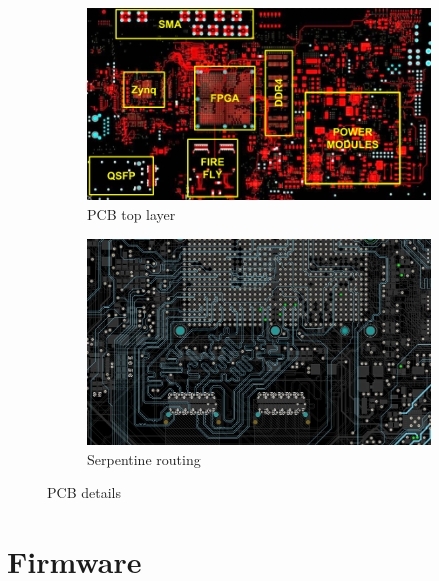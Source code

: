 \documentclass[a4paper]{PoS}
\begin{document}
\begin{figure}
\begin{subfigure}{.5\textwidth}
  \centering
  \includegraphics[width=1\linewidth]{pcb.png}
  \caption{PCB top layer}
  \label{fig:toplayer}
\end{subfigure}%
\begin{subfigure}{.5\textwidth}
  \centering
  \includegraphics[width=0.9\linewidth]{serpentine_routing.png}
  \caption{Serpentine routing}
  \label{fig:serpantine}
\end{subfigure}
\caption{PCB details}
\label{fig:pcb}
\end{figure}



\section{Firmware}
\end{document}
